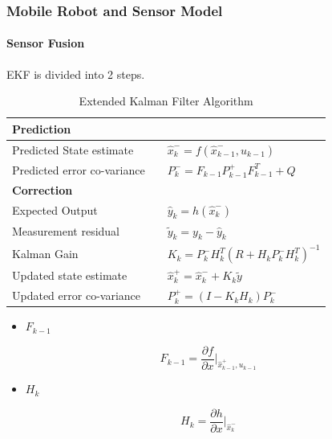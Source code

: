 \begin{frame}
	\frametitle{Mobile Robot and Sensor Model}
	\framesubtitle{Sensor Fusion}
	\begin{minipage}{.8\textwidth}
	EKF is divided into 2 steps.
	\begin{table}[h]
		\begin{flushleft}
			\caption{Extended Kalman Filter Algorithm}
			\begin{tabular}{lll}
				\hline
				\textbf{Prediction}         && \\
				\hline
				Predicted State estimate    && \(\boxed{\hat{x}^-_k} = f(\hat{x}^-_{k-1},u_{k-1})\) \\
				Predicted error co-variance && \(P^-_k = F_{k-1}P^+_{k-1}F^T_{k-1} + Q\)\\
				\hline
				\textbf{Correction}         && \\
				\hline
				Expected Output             && \(\hat{y}_k = h(\hat{x}^-_k)\)\\
				Measurement residual        && \(\tilde{y}_k = \boxed{y_k} - \hat{y}_k\)\\
				Kalman Gain                 && \(K_k = P^-_kH^T_k(R+H_kP^-_kH^T_k)^{-1}\)\\
				Updated state estimate      && \(\hat{x}^+_k = \hat{x}^-_k + K_k\tilde{y}\)\\
				Updated error co-variance   && \(P^+_k = (I-K_kH_k)P^-_k\)\\
				\hline
			\end{tabular}
		\end{flushleft}
	\end{table}
	\end{minipage}%
	\begin{minipage}{.2\textwidth}
		\begin{flushleft}
		\begin{itemize}
			\item \(F_{k-1}\)
		\end{itemize}
			\[F_{k-1} = \frac{\partial f}{\partial x}|_{\hat{x}^+_{k-1},u_{k-1}}\]
		\begin{itemize}
			\item \(H_k\)
		\end{itemize}
			\[H_k = \frac{\partial h}{\partial x}|_{\hat{x}^-_k}\]
		\end{flushleft}
	\end{minipage}
\end{frame}


